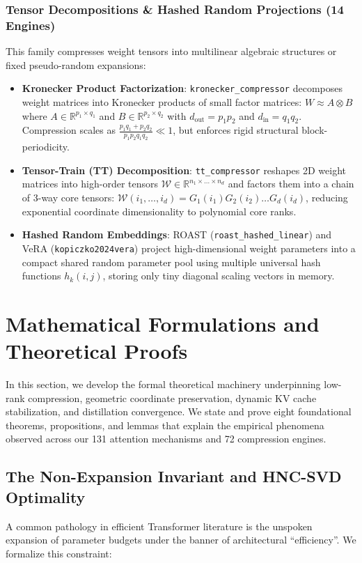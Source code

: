 \documentclass{article}
\begin{document}
\subsubsection{Tensor Decompositions \& Hashed Random Projections (14 Engines)}
This family compresses weight tensors into multilinear algebraic structures or fixed pseudo-random expansions:
\begin{itemize}
    \item \textbf{Kronecker Product Factorization}: \texttt{kronecker\_compressor} \citep{badri2023halfquadratic} decomposes weight matrices into Kronecker products of small factor matrices: $W \approx A \otimes B$ where $A \in \mathbb{R}^{p_1 \times q_1}$ and $B \in \mathbb{R}^{p_2 \times q_2}$ with $d_{\text{out}} = p_1 p_2$ and $d_{\text{in}} = q_1 q_2$. Compression scales as $\frac{p_1 q_1 + p_2 q_2}{p_1 p_2 q_1 q_2} \ll 1$, but enforces rigid structural block-periodicity.
    \item \textbf{Tensor-Train (TT) Decomposition}: \texttt{tt\_compressor} reshapes 2D weight matrices into high-order tensors $\mathcal{W} \in \mathbb{R}^{n_1 \times \dots \times n_d}$ and factors them into a chain of 3-way core tensors: $\mathcal{W}(i_1, \dots, i_d) = G_1(i_1) G_2(i_2) \dots G_d(i_d)$, reducing exponential coordinate dimensionality to polynomial core ranks.
    \item \textbf{Hashed Random Embeddings}: ROAST (\texttt{roast\_hashed\_linear}) and VeRA (\texttt{kopiczko2024vera}) project high-dimensional weight parameters into a compact shared random parameter pool using multiple universal hash functions $h_k(i, j)$, storing only tiny diagonal scaling vectors in memory.
\end{itemize}

\section{Mathematical Formulations and Theoretical Proofs}
\label{sec:theory}

In this section, we develop the formal theoretical machinery underpinning low-rank compression, geometric coordinate preservation, dynamic KV cache stabilization, and distillation convergence. We state and prove eight foundational theorems, propositions, and lemmas that explain the empirical phenomena observed across our 131 attention mechanisms and 72 compression engines.

\subsection{The Non-Expansion Invariant and HNC-SVD Optimality}
A common pathology in efficient Transformer literature is the unspoken expansion of parameter budgets under the banner of architectural ``efficiency''. We formalize this constraint:
\end{document}
